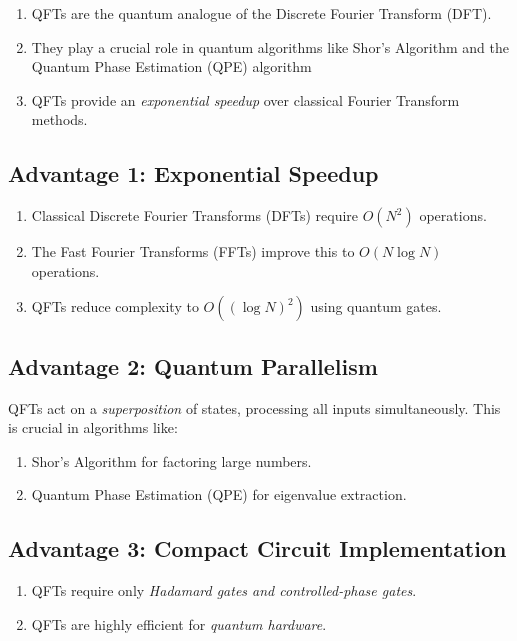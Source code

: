 \documentclass[%
oneside,                 %
final,                   %
10pt]{article}
\begin{document}
\begin{enumerate}
\item QFTs are the quantum analogue of the Discrete Fourier Transform (DFT).

\item They play a crucial role in quantum algorithms like Shor’s Algorithm and the Quantum Phase Estimation (QPE) algorithm

\item QFTs provide an \emph{exponential speedup} over classical Fourier Transform methods.
\end{enumerate}

\noindent
\subsection{Advantage 1: Exponential Speedup}
\begin{enumerate}
\item Classical Discrete Fourier Transforms (DFTs) require $O(N^2)$ operations.

\item The Fast Fourier Transforms (FFTs) improve this to $O(N \log N)$ operations.

\item QFTs reduce complexity to $O((\log N)^2)$ using quantum gates.
\end{enumerate}

\noindent
\subsection{Advantage 2: Quantum Parallelism}
QFTs act on a \emph{superposition} of states, processing all inputs simultaneously.
This is crucial in algorithms like:
\begin{enumerate}
\item Shor’s Algorithm for factoring large numbers.

\item Quantum Phase Estimation (QPE) for eigenvalue extraction.
\end{enumerate}

\noindent
\subsection{Advantage 3: Compact Circuit Implementation}

\begin{enumerate}
\item QFTs require only \emph{Hadamard gates and controlled-phase gates}.

\item QFTs are highly efficient for \emph{quantum hardware}.
\end{enumerate}
\end{document}
